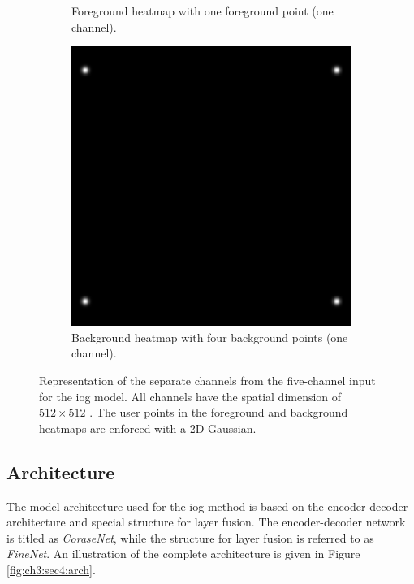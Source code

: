 \begin{figure}
\begin{subfigure}[t]{0.3\textwidth}
		\caption{Foreground heatmap with one foreground point (one channel).}
		\label{fig:ch3:sec4:fg_channel}
	\end{subfigure}
	\hfill
	\begin{subfigure}[t]{0.3\textwidth}
		\centering
		\includegraphics[width=\textwidth]{figures/chap34_channel_bg.png}
		\caption{Background heatmap with four background points (one channel).}
		\label{fig:ch3:sec4:bg_channel}
	\end{subfigure}
	\caption[Five-channel IOG model input]{
		Representation of the separate channels from the five-channel input for the \gls{iog} model.
		All channels have the spatial dimension of $512 \times 512$ .
		The user points in the foreground and background heatmaps are enforced with a 2D Gaussian.
	} \label{fig:ch3:sec4:model_input_channels}
\end{figure}

\subsection{Architecture}\label{ord:ch3:sec4:subsec3}

The model architecture used for the \gls{iog} method is based on the encoder-decoder architecture and special structure for layer fusion.
The encoder-decoder network is titled as \textit{CoraseNet}, while the structure for layer fusion is referred to as \textit{FineNet}.
An illustration of the complete architecture is given in Figure \ref{fig:ch3:sec4:arch}.


